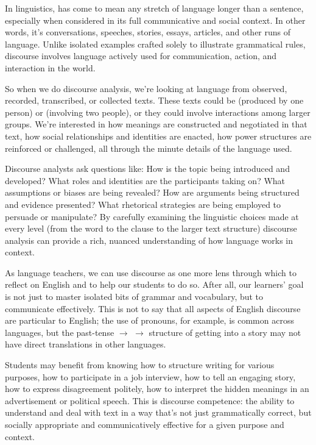 In linguistics,  has come to mean any stretch of language longer than a sentence, especially when considered in its full communicative and social context. In other words, it's conversations, speeches, stories, essays, articles, and other runs of language. Unlike isolated examples crafted solely to illustrate grammatical rules, discourse involves language actively used for communication, action, and interaction in the world.

So when we do discourse analysis, we're looking at language from observed, recorded, transcribed, or collected texts. These texts could be  (produced by one person) or  (involving two people), or they could involve interactions among larger groups. We're interested in how meanings are constructed and negotiated in that text, how social relationships and identities are enacted, how power structures are reinforced or challenged, all through the minute details of the language used.

Discourse analysts ask questions like: How is the topic being introduced and developed? What roles and identities are the participants taking on? What assumptions or biases are being revealed? How are arguments being structured and evidence presented? What rhetorical strategies are being employed to persuade or manipulate? By carefully examining the linguistic choices made at every level (from the word to the clause to the larger text structure) discourse analysis can provide a rich, nuanced understanding of how language works in context.

As language teachers, we can use discourse as one more lens through which to reflect on English and to help our students to do so. After all, our learners' goal is not just to master isolated bits of grammar and vocabulary, but to communicate effectively. This is not to say that all aspects of English discourse are particular to English; the use of pronouns, for example, is common across languages, but the past-tense $\rightarrow$  $\rightarrow$  structure of getting into a story may not have direct translations in other languages.

Students may benefit from knowing how to structure writing for various purposes, how to participate in a job interview, how to tell an engaging story, how to express disagreement politely, how to interpret the hidden meanings in an advertisement or political speech. This is discourse competence: the ability to understand and deal with text in a way that's not just grammatically correct, but socially appropriate and communicatively effective for a given purpose and context.

